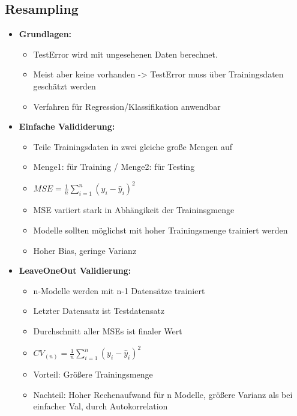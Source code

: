 \documentclass[a4paper]{article}
\begin{document}
\begin{landscape}
\begin{multicols}{3}
        \section{Resampling}
        \begin{itemize}[noitemsep,nolistsep,leftmargin=*]
            \item \textbf{Grundlagen:}
            \begin{itemize}[noitemsep,nolistsep,leftmargin=*]
                \item TestError wird mit ungesehenen Daten berechnet.
                \item Meist aber keine vorhanden -> TestError muss über Trainingsdaten geschätzt werden
                \item Verfahren für Regression/Klassifikation anwendbar
            \end{itemize}
            \item \textbf{Einfache Valididerung:}
            \begin{itemize}[noitemsep,nolistsep,leftmargin=*]
                \item Teile Trainingsdaten in zwei gleiche große Mengen auf
                \item Menge1: für Training / Menge2: für Testing
                \item $MSE = \frac{1}{n}\sum_{i=1}^{n}(y_i - \hat{y}_i)^2$
                \item MSE variiert stark in Abhängikeit der Traininsgmenge
                \item Modelle sollten möglichst mit hoher Trainingsmenge trainiert werden
                \item Hoher Bias, geringe Varianz
            \end{itemize}
            \item \textbf{LeaveOneOut Validierung:}
            \begin{itemize}[noitemsep,nolistsep,leftmargin=*]
                \item n-Modelle werden mit n-1 Datensätze trainiert
                \item Letzter Datensatz ist Testdatensatz
                \item Durchschnitt aller MSEs ist finaler Wert
                \item $CV_{(n)} = \frac{1}{n}\sum_{i=1}^n (y_i - \hat{y}_i)^2$
                \item Vorteil: Größere Trainingsmenge
                \item Nachteil: Hoher Rechenaufwand für n Modelle, größere Varianz als bei einfacher Val, durch Autokorrelation

\end{itemize}
\end{itemize}
\end{multicols}
\end{landscape}
\end{document}
